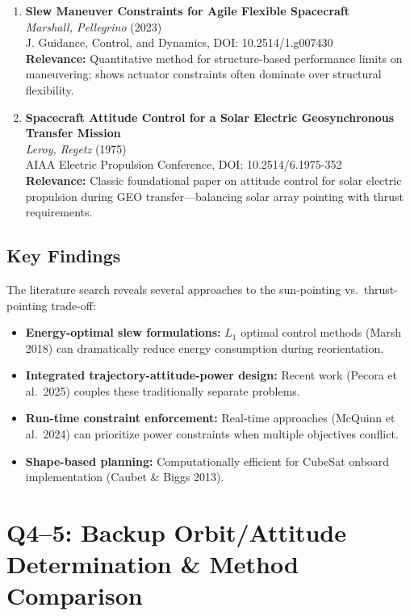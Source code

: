 \documentclass[11pt]{article}
\begin{document}
\begin{enumerate}[label=\textbf{\arabic*.},resume]
    \item \textbf{Slew Maneuver Constraints for Agile Flexible Spacecraft}\\
    \textit{Marshall, Pellegrino} (2023)\\
    J. Guidance, Control, and Dynamics, DOI: 10.2514/1.g007430\\
    \textbf{Relevance:} Quantitative method for structure-based performance limits on maneuvering; shows actuator constraints often dominate over structural flexibility.

    \item \textbf{Spacecraft Attitude Control for a Solar Electric Geosynchronous Transfer Mission}\\
    \textit{Leroy, Regetz} (1975)\\
    AIAA Electric Propulsion Conference, DOI: 10.2514/6.1975-352\\
    \textbf{Relevance:} Classic foundational paper on attitude control for solar electric propulsion during GEO transfer---balancing solar array pointing with thrust requirements.
\end{enumerate}

\subsection{Key Findings}
The literature search reveals several approaches to the sun-pointing vs.\ thrust-pointing trade-off:
\begin{itemize}
    \item \textbf{Energy-optimal slew formulations:} $L_1$ optimal control methods (Marsh 2018) can dramatically reduce energy consumption during reorientation.
    \item \textbf{Integrated trajectory-attitude-power design:} Recent work (Pecora et al.\ 2025) couples these traditionally separate problems.
    \item \textbf{Run-time constraint enforcement:} Real-time approaches (McQuinn et al.\ 2024) can prioritize power constraints when multiple objectives conflict.
    \item \textbf{Shape-based planning:} Computationally efficient for CubeSat onboard implementation (Caubet \& Biggs 2013).
\end{itemize}

\section{Q4--5: Backup Orbit/Attitude Determination \& Method Comparison}
\label{sec:attitude}
\end{document}
